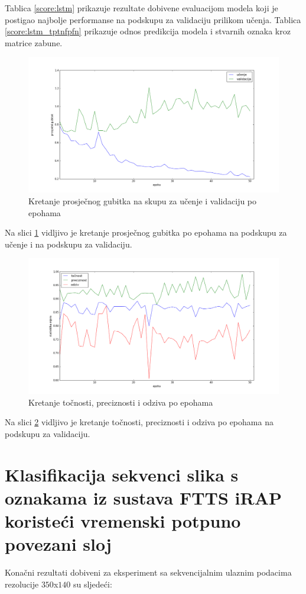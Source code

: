 \documentclass[times, utf8, diplomski, numeric]{fer}
\begin{document}
\noindent Tablica \ref{score:lstm} prikazuje rezultate dobivene evaluacijom modela koji je postigao najbolje performanse na podskupu za validaciju prilikom učenja.
Tablica \ref{score:lstm_tptnfpfn} prikazuje odnos predikcija modela i stvarnih oznaka kroz matrice zabune.

\begin{figure}[H]
\centering
\includegraphics[scale=0.35]{images/lstm_loss.png}
\caption{Kretanje prosječnog gubitka na skupu za učenje i validaciju po epohama}
\label{img:lstm_loss}
\end{figure}
\noindent Na slici \ref{img:lstm_loss} vidljivo je kretanje prosječnog gubitka po epohama na podskupu za učenje i na podskupu za validaciju.

\begin{figure}[H]
\centering
\includegraphics[scale=0.35]{images/lstm_ac_ap.png}
\caption{Kretanje točnosti, preciznosti i odziva po epohama}
\label{img:lstm_ac_ap}
\end{figure}
\noindent Na slici \ref{img:lstm_ac_ap} vidljivo je kretanje točnosti, preciznosti i odziva po epohama na podskupu za validaciju.

\section{Klasifikacija sekvenci slika s oznakama iz sustava FTTS iRAP koristeći vremenski potpuno povezani sloj}
Konačni rezultati dobiveni za eksperiment sa sekvencijalnim ulaznim podacima rezolucije $350$x$140$ su sljedeći:
\end{document}
